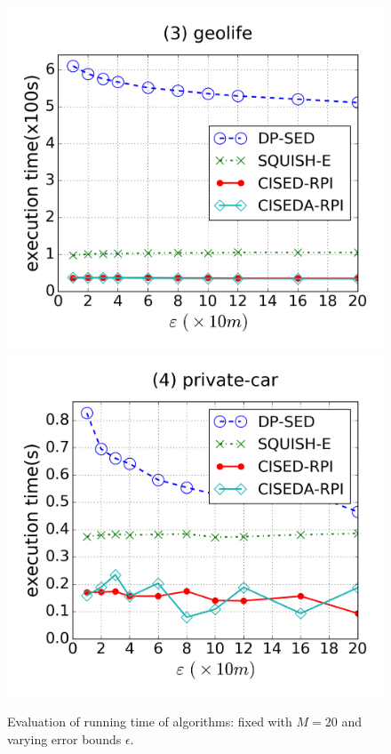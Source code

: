 \begin{figure}[tb!]
\includegraphics[scale = 0.250]{figures/Exp-time-epsilon-geolife.png}
\includegraphics[scale = 0.250]{figures/Exp-time-epsilon-private.png}
\vspace{-3ex}
\caption{\small Evaluation of running time of \lsa algorithms: fixed with $M=20$ and varying error bounds $\epsilon$.}
\label{fig:time-epsilon}
\vspace{-1ex}
\end{figure}



